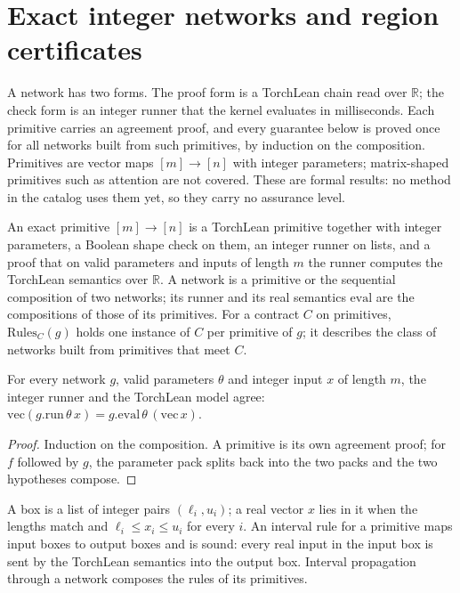 \chapter{Exact integer networks and region certificates}

A network has two forms. The proof form is a TorchLean chain read over $\mathbb R$; the check form
is an integer runner that the kernel evaluates in milliseconds. Each primitive carries an agreement
proof, and every guarantee below is proved once for all networks built from such primitives, by
induction on the composition. Primitives are vector maps $[m]\to[n]$ with integer parameters;
matrix-shaped primitives such as attention are not covered. These are formal results: no method in
the catalog uses them yet, so they carry no assurance level.

\begin{definition}\label{def:exact_net}
\leanok
An exact primitive $[m]\to[n]$ is a TorchLean primitive together with integer parameters, a Boolean
shape check on them, an integer runner on lists, and a proof that on valid parameters and inputs of
length $m$ the runner computes the TorchLean semantics over $\mathbb R$. A network is a primitive or
the sequential composition of two networks; its runner and its real semantics $\mathrm{eval}$ are
the compositions of those of its primitives. For a contract $C$ on primitives, $\mathrm{Rules}_C(g)$
holds one instance of $C$ per primitive of $g$; it describes the class of networks built from
primitives that meet $C$.
\end{definition}

\begin{theorem}\label{thm:exact_agrees}
\leanok
{}
For every network $g$, valid parameters $\theta$ and integer input $x$ of length $m$, the integer
runner and the TorchLean model agree: $\mathrm{vec}(g.\mathrm{run}\,\theta\,x) =
g.\mathrm{eval}\,\theta\,(\mathrm{vec}\,x)$.
\end{theorem}
\begin{proof}
\leanok
Induction on the composition. A primitive is its own agreement proof; for $f$ followed by $g$,
the parameter pack splits back into the two packs and the two hypotheses compose.
\end{proof}

\begin{definition}\label{def:interval_rule}
\leanok
{}
A box is a list of integer pairs $(\ell_i,u_i)$; a real vector $x$ lies in it when the lengths match
and $\ell_i\le x_i\le u_i$ for every $i$. An interval rule for a primitive maps input boxes to output
boxes and is sound: every real input in the input box is sent by the TorchLean semantics into the
output box. Interval propagation through a network composes the rules of its primitives.
\end{definition}


